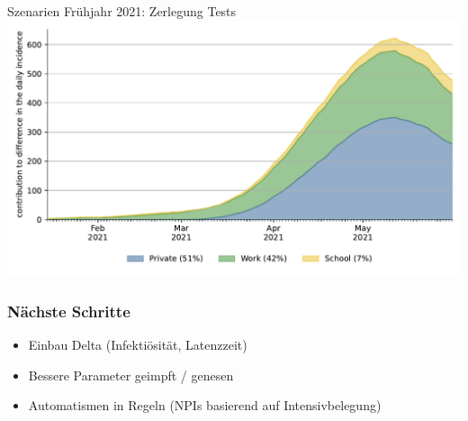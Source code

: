 \documentclass[11pt]{beamer}
\begin{document}
\begin{frame}{Szenarien Frühjahr 2021: Zerlegung Tests}
    \centering
    \includegraphics[width=\textwidth]{figures/results/figures/full_decomposition_rapid_tests_area}
\end{frame}


\begin{frame}\frametitle{Nächste Schritte}
    \begin{itemize}
        \item Einbau Delta (Infektiösität, Latenzzeit) \\[3ex]
        \item Bessere Parameter geimpft / genesen \\[3ex]
        \item Automatismen in Regeln (NPIs basierend auf Intensivbelegung)
    \end{itemize}
\end{frame}

 {
    \begin{frame}
        \frametitle{}
    \end{frame}

}



%     
\end{document}
